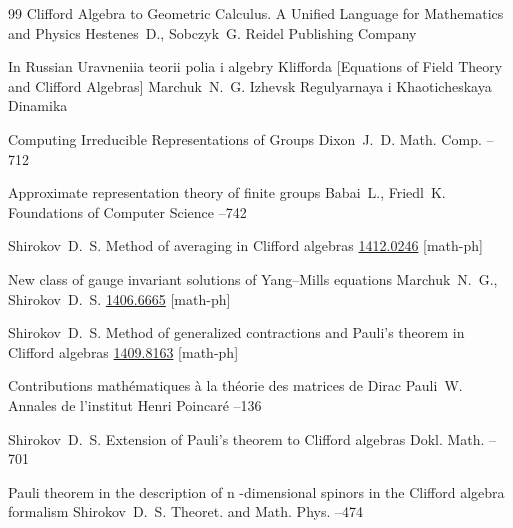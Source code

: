 \begin{thebibliography}{99}
\book  Clifford Algebra to Geometric Calculus. A Unified Language for Mathematics and Physics 
\by    Hestenes~D., Sobczyk~G.
\publaddr Reidel Publishing Company


\lang In Russian
\book Uravneniia teorii polia i algebry Klifforda \rm [Equations of Field Theory and Clifford Algebras]
\by    Marchuk~N.~G.
\publaddr Izhevsk
\publ Regulyarnaya i Khaoticheskaya Dinamika

\paper   Computing Irreducible Representations of Groups 
\by Dixon~J.~D.
\jour  Math. Comp.
--712 

\paper Approximate representation theory of finite groups
\by    Babai~L.,  Friedl~K.
\jour Foundations of Computer Science
--742 

\by Shirokov~D.~S.
\preprint Method of averaging in Clifford algebras
\arxiv \href{http://arxiv.org/abs/1412.0246}{1412.0246} [math-ph]


\preprint New class of gauge invariant solutions of Yang--Mills equations
\by Marchuk~N.~G., Shirokov~D.~S.
\arxiv \href{http://arxiv.org/abs/1406.6665}{1406.6665} [math-ph]


\by Shirokov~D.~S.
\preprint Method of generalized contractions and Pauli's theorem in Clifford algebras
\arxiv \href{http://arxiv.org/abs/1409.8163}{1409.8163} [math-ph]


\paper Contributions math\'ematiques \`a la th\'eorie des matrices de Dirac
\by    Pauli~W.
\jour Annales de l'institut Henri Poincar\'e 
--136




\by Shirokov~D.~S.
\paper Extension of Pauli's theorem to Clifford algebras
\jour  Dokl. Math.
–701  



\paper Pauli theorem in the description of n -dimensional spinors in the Clifford algebra formalism
\by Shirokov~D.~S.
\jour Theoret. and Math. Phys.
--474



\end{thebibliography}
